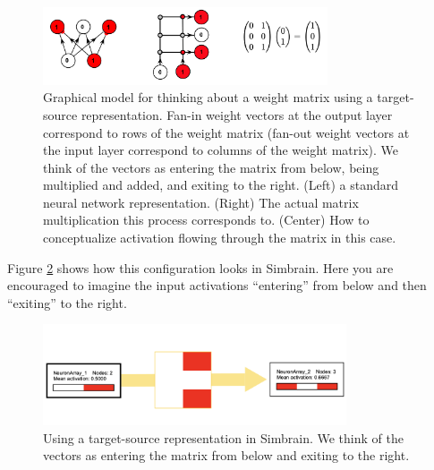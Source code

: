 \begin{figure}[h]
\centering
\includegraphics[width=0.75\textwidth]{images/targetSource.png}
\caption[Jeff Yoshimi.]{Graphical model for thinking about a weight matrix using a target-source representation.  Fan-in weight vectors at the output layer correspond to rows of the weight matrix (fan-out weight vectors at the input layer correspond to columns of the weight matrix). We think of the vectors as entering the matrix from below, being multiplied and added, and exiting to the right. (Left) a standard neural network representation. (Right) The actual matrix multiplication this process corresponds to. (Center) How to conceptualize activation flowing through the matrix in this case. }
\label{targetSourceConvention}
\end{figure}

Figure \ref{targetSourceSimbrain} shows how this configuration looks in Simbrain. Here you are encouraged to imagine  the input activations  ``entering'' from below and then ``exiting'' to the right.

\begin{figure}[h]
\centering
\includegraphics[width=0.8\textwidth]{images/targetSourceSimbrain.png}
\caption[Jeff Yoshimi.]{Using a target-source representation in Simbrain. We think of the vectors as entering the matrix from below and exiting to the right.}
\label{targetSourceSimbrain}
\end{figure}

